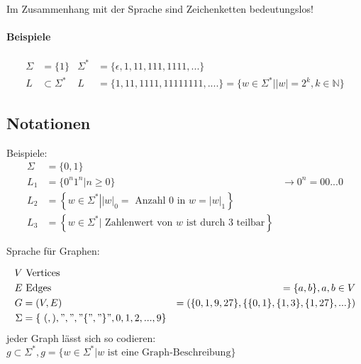Im Zusammenhang mit der Sprache sind Zeichenketten bedeutungslos!

\paragraph{Beispiele}

\begin{align*}
	\Sigma &= \{1\} & \Sigma^\ast &= \{\epsilon, 1,11,111,1111,...\} \\
	L &\subset \Sigma^\ast  & L &=\{1,11,1111,11111111,....\} = \{w \in \Sigma^\ast| |w|=2^k, k \in \mathbb{N}\}
\end{align*}


\subsection{Notationen}
Beispiele:
\begin{align*}
	\Sigma &= \{0,1\} \\
	L_1 &= \{0^n 1^n | n \geq 0\} &\rightarrow 0^n = 00...0 \\
	L_2 &= \left\{ w \in \Sigma^\ast \left| \left|w\right|_0 = \text{ Anzahl 0 in } w = \left|w\right|_1 \right.\right\} \\
	L_3 &= \left\{w \in \Sigma^\ast \left| \text{ Zahlenwert von } w \text{ ist durch 3 teilbar} \right.\right\}
\end{align*}

Sprache für Graphen:

\begin{align*}
V & \text{ Vertices} \\
E & \text{ Edges} &= \{a,b\}, a,b \in V \\
G &= (V, E) &= (\{0,1,9,27\},\{\{0,1\},\{1,3\},\{1,27\},...\}) \\
\Sigma &= \left\{\ (,),",","\{","\}", 0, 1,2,...,9 \right\}
\end{align*}
jeder Graph lässt sich so codieren: $g \subset \Sigma^\ast, g = \{w \in \Sigma^\ast \left| w \text{ ist eine Graph-Beschreibung} \right.\}$

